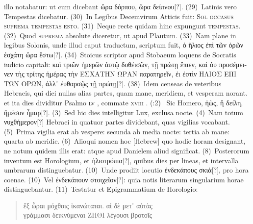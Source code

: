 \documentclass[draft,12pt,twoside,a4paper]{book}
\newcounter{sourcepagenr}
\newcounter{pdfpagenr}
\newcommand{\lnr}[1]{\nrfont({#1})~\normalfont}
\newcommand{\plnr}[3]{%
	\setcounter{pdfpagenr}{{#1}}%
	\setcounter{sourcepagenr}{{#2}}%
	\nrfont(\arabic{sourcepagenr}:{{#3}})~\normalfont%
}
\newcommand{\rnum}[1]{%
\textsc{#1}%
}
\begin{document}
illo notabatur: ut cum dicebant \textgreek{ὥρα δόρπου, ὥρα δείπνου[?]}.
\lnr{29}Latinis
vero Tempestas dicebatur.
\lnr{30}In Legibus Decemvirum Atticis fuit:
\textsc{Sol occasus suprema tempestas esto}.
\lnr{31}Neque recte
quidam hinc expungunt \textsc{tempestas}.
\lnr{32}Quod \textsc{suprema} absolute
diceretur, ut apud Plautum.
\lnr{33}Nam plane in legibus Solonis, unde illud
caput traductum, scriptum fuit,
 \textgreek{ὁ ἥλιος ἐπὶ τῶν ὀρῶν ἐσχάτη ὥρα ἔστω[?]}.
\lnr{34}Stoicus
scriptor apud Stobaeum loquens de Socratis iudicio capitali: 
\textgreek{καὶ
τριῶν ἡμερῶν ἀυτῷ δοθέισῶν, τῇ πρώτῃ ἔπιεν,
 καὶ ὀυ προσέμεινεν τὴς τρίτης ἡμέρας τὴν
ΕΣΧΑΤΗΝ ΩΡΑΝ παρατηρεῖν, ἐι ἐστὶν ΗΛΙΟΣ ΕΠΙ ΤΩΝ
ΟΡΩΝ, ἀλλ᾽ ἐυθαρσῷς τῇ πρώτῃ[?]}.
\lnr{38}Idem censeas de veteribus Hebraeis,
qui diei nullas alias partes, quam mane, meridiem, et vesperam norant.
et ita dies dividitur Psalmo \rnum{lv}, commate \rnum{xviii}.
%
\plnr{88}{5}{2}Sic Homero,
\textgreek{ἠὼς, ἢ δείλη, ἢμέσον ἦμαρ[?]}.
\lnr{3}Sed hic dies intelligitur Lux, exclusa nocte.
\lnr{4}Nam totum \textgreek{νυχθήμερον[?]} Hebraei in quatuor partes
 dividebant, quas vigilias
vocabant.
\lnr{5}Prima vigilia erat ab vespere: secunda ab media nocte:
tertia ab mane: quarta ab meridie.
\lnr{6}Alioqui nomen hoc \texthebrew{[Hebrew]} quo hodie
horam designant, ne notum quidem illis erat: atque apud Danielem
aliud significat.
\lnr{8}Posterorum inventum est Horologium, et \textgreek{ἡλιοτρόπια[?]},
quibus dies per lineas, et intervalla umbrarum distinguebatur.
\lnr{10}Unde prodiit locutio \textgreek{ἑνδεκάπους σκιὰ[?]}, pro hora coenae.
\lnr{10}Vel \textgreek{ἑνδεκάπουν στοιχεῖον[?]}:
quia notis literarum singularium horae distinguebantur.
\lnr{11}Testatur et Epigrammatium de Horologio:
\begin{verse}
\textgreek{ἓξ ὧραι μόχθοις ἱκανώταται. αἱ δὲ μετ᾽ αὐτὰς}\\
\textgreek{γράμμασι δεικνύμεναι ΖΗΘΙ λέγουσι βροτοῖς}
\end{verse}
%
%  
\end{document}

